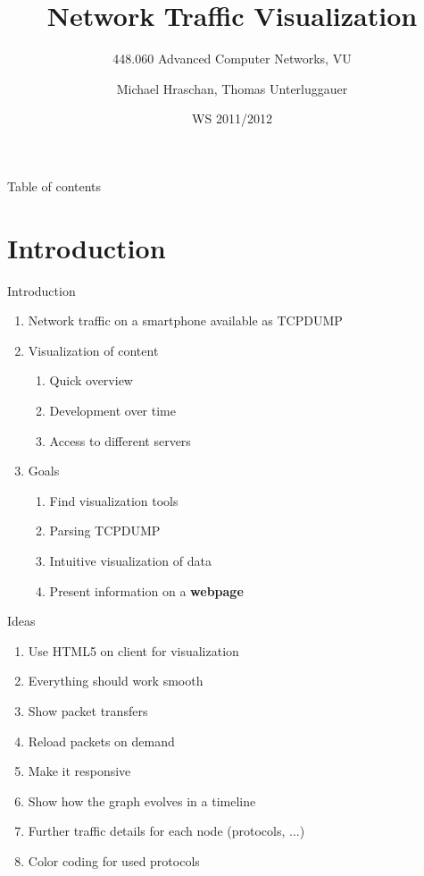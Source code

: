 \documentclass{beamer}
\title
{Network Traffic Visualization}
\subtitle
{448.060 Advanced Computer Networks, VU}
\author
{Michael Hraschan, Thomas Unterluggauer}
\date
{WS 2011/2012}
\begin{document}
\lstset{language=XML,tabsize=2,basicstyle=\footnotesize,breaklines=true}

\begin{frame}
	\titlepage
\end{frame}

\begin{frame}{Table of contents}
	\tableofcontents
\end{frame}

\section{Introduction}
  
\begin{frame}{Introduction}
 \begin{enumerate}
  \item Network traffic on a smartphone available as TCPDUMP
  \item Visualization of content
  \begin{enumerate}
    \item Quick overview
    \item Development over time
    \item Access to different servers
  \end{enumerate}
  \item Goals
  \begin{enumerate}
    \item Find visualization tools
    \item Parsing TCPDUMP
    \item Intuitive visualization of data
    \item Present information on a \textbf{webpage}
  \end{enumerate}
 \end{enumerate}
\end{frame}

\begin{frame}{Ideas}
 \begin{enumerate}
  \item Use HTML5 on client for visualization
  \item Everything should work smooth
  \item Show packet transfers
  \item Reload packets on demand
  \item Make it responsive
  \item Show how the graph evolves in a timeline
  \item Further traffic details for each node (protocols, ...)
  \item Color coding for used protocols
 \end{enumerate}
\end{frame}
\end{document}
